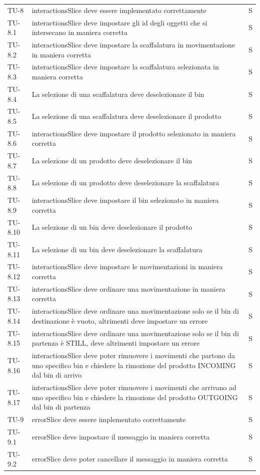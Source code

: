 \begin{xltabular}{0.9\textwidth}{X | p{0.6\textwidth} | p{0.1\textwidth} }
    TU-8 & interactionsSlice deve essere implementato correttamente & S\\
    TU-8.1 & interactionsSlice deve impostare gli id degli oggetti che si intersecano in maniera corretta & S\\
    TU-8.2 & interactionsSlice deve impostare la scaffalatura in movimentazione in maniera corretta & S\\
    TU-8.3 & interactionsSlice deve impostare la scaffalatura selezionata in maniera corretta & S\\
    TU-8.4 & La selezione di una scaffalatura deve deselezionare il bin & S\\
    TU-8.5 & La selezione di una scaffalatura deve deselezionare il prodotto & S\\
    TU-8.6 & interactionsSlice deve impostare il prodotto selezionato in maniera corretta & S\\
    TU-8.7 & La selezione di un prodotto deve deselezionare il bin & S\\
    TU-8.8 & La selezione di un prodotto deve deselezionare la scaffalatura & S\\
    TU-8.9 & interactionsSlice deve impostare il bin selezionato in maniera corretta & S\\
    TU-8.10 & La selezione di un bin deve deselezionare il prodotto & S\\
    TU-8.11 & La selezione di un bin deve deselezionare la scaffalatura & S\\
    TU-8.12 & interactionsSlice deve impostare le movimentazioni in maniera corretta & S\\
    TU-8.13 & interactionsSlice deve ordinare una movimentazione in maniera corretta & S\\
    TU-8.14 & interactionsSlice deve ordinare una movimentazione solo se il bin di destinazione è vuoto, altrimenti deve impostare un errore & S\\
    TU-8.15 & interactionsSlice deve ordinare una movimentazione solo se il bin di partenza è STILL, deve altrimenti impostare un errore & S\\
    TU-8.16 & interactionsSlice deve poter rimuovere i movimenti che partono da uno specifico bin e chiedere la rimozione del prodotto INCOMING dal bin di arrivo & S\\
    TU-8.17 & interactionsSlice deve poter rimuovere i movimenti che arrivano ad uno specifico bin e chiedere la rimozione del prodotto OUTGOING dal bin di partenza & S\\
   
    TU-9 & errorSlice deve essere implementato correttamente & S\\
    TU-9.1 & errorSlice deve impostare il messaggio in maniera corretta & S\\
    TU-9.2 & errorSlice deve poter cancellare il messaggio in maniera corretta & S\\
\end{xltabular}

